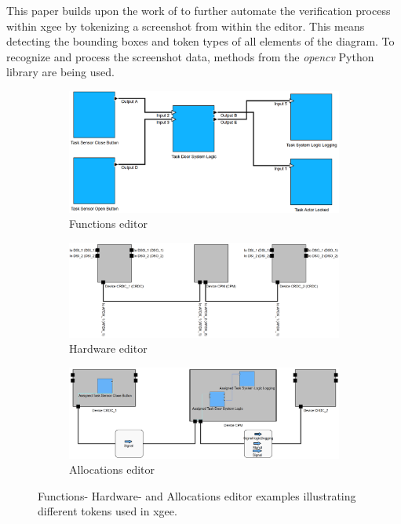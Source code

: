 This paper builds upon the work of \cite{waldvogel_annighoefer_models_2024} to further automate the verification process within \acrshort{xgee} by tokenizing a screenshot from within the editor. This means detecting the bounding boxes and token types of all elements of the diagram. To recognize and process the screenshot data, methods from the \textit{\acrshort{opencv}} Python library are being used.

\begin{figure}[h]
    \centering
    \begin{subfigure}{0.3\textwidth}
        \includegraphics[width=\linewidth]{pictures/functions_editor.png}
        \caption{Functions editor}
        \label{fig:functions_editor}
    \end{subfigure}
    \hfill
    \begin{subfigure}{0.3\textwidth}
        \includegraphics[width=\linewidth]{pictures/hardware_editor.png}
        \caption{Hardware editor}
        \label{fig:hardware_editor}
    \end{subfigure}
    \hfill
    \begin{subfigure}{0.3\textwidth}
        \includegraphics[width=\linewidth]{pictures/allocations_editor.png}
        \caption{Allocations editor}
        \label{fig:allocations_editor}
    \end{subfigure}

    \caption{Functions- Hardware- and Allocations editor examples illustrating different tokens used in \acrshort{xgee}.}
    \label{fig:editors}
\end{figure}

